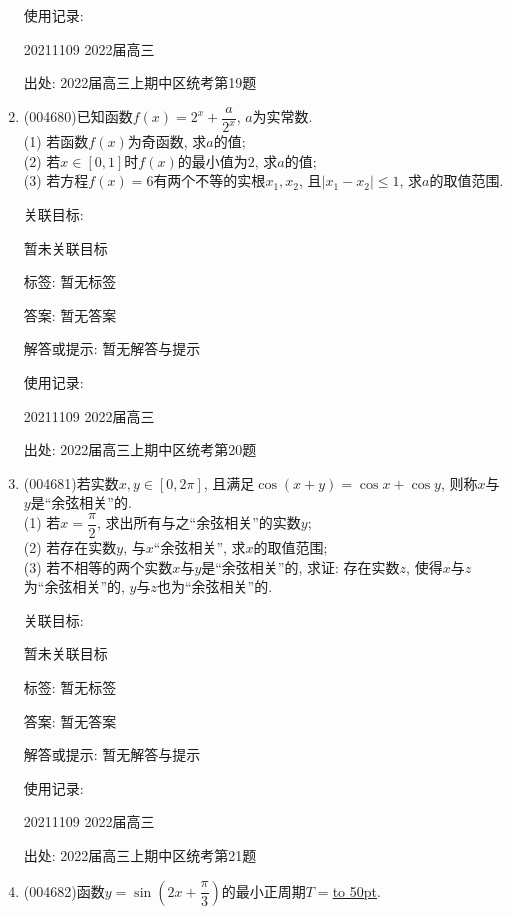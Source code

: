\documentclass[10pt,a4paper]{article}
\newcommand{\blank}[1]{\underline{\hbox to #1pt{}}}
\begin{document}
\begin{enumerate}[1.]
使用记录:

20211109	2022届高三		


出处: 2022届高三上期中区统考第19题
\item { (004680)}已知函数$f(x)=2^x+\dfrac a{2^x}$, $a$为实常数.\\
(1) 若函数$f(x)$为奇函数, 求$a$的值;\\
(2) 若$x\in [0,1]$时$f(x)$的最小值为$2$, 求$a$的值;\\
(3) 若方程$f(x)=6$有两个不等的实根$x_1,x_2$, 且$|x_1-x_2|\le 1$, 求$a$的取值范围.


关联目标:

暂未关联目标



标签: 暂无标签

答案: 暂无答案

解答或提示: 暂无解答与提示

使用记录:

20211109	2022届高三			


出处: 2022届高三上期中区统考第20题
\item { (004681)}若实数$x,y\in [0,2\pi]$, 且满足$\cos (x+y)=\cos x+\cos y$, 则称$x$与$y$是``余弦相关''的.\\
(1) 若$x=\dfrac{\pi}2$, 求出所有与之``余弦相关''的实数$y$;\\
(2) 若存在实数$y$, 与$x$``余弦相关'', 求$x$的取值范围;\\
(3) 若不相等的两个实数$x$与$y$是``余弦相关''的, 求证: 存在实数$z$, 使得$x$与$z$ 为``余弦相关''的, $y$与$z$也为``余弦相关''的.


关联目标:

暂未关联目标



标签: 暂无标签

答案: 暂无答案

解答或提示: 暂无解答与提示

使用记录:

20211109	2022届高三			


出处: 2022届高三上期中区统考第21题
\item { (004682)}函数$y=\sin (2x+\dfrac{\pi}3)$的最小正周期$T=$\blank{50}.



\end{enumerate}
\end{document}
